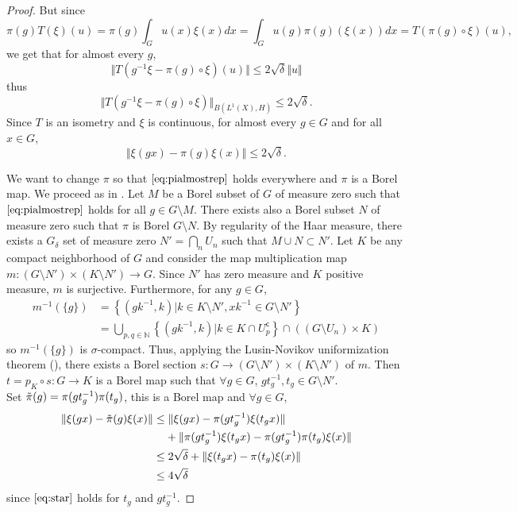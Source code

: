 \documentclass{article}
\theoremstyle{definition}
\theoremstyle{remark}
\numberwithin{equation}{section}
\newcommand{\N}{\mathbb{N}}
\begin{document}
\begin{proof}
But since $$\pi(g)T(\xi)(u)=\pi(g)\int_G u(x)\xi(x)dx=\int_G u(g)\pi(g)(\xi(x))dx=T(\pi(g)\circ \xi)(u),$$we get that for almost every $g$, $$\Vert T(g^{-1}\xi-\pi(g)\circ \xi)(u)\Vert \leq 2\sqrt{\delta}\Vert u\Vert$$
thus $$\Vert T(g^{-1}\xi-\pi(g)\circ \xi)\Vert_{B(L^1(X),H)} \leq 2\sqrt{\delta}.$$Since $T$ is an isometry and $\xi$ is continuous, for almost every $g\in G$ and for all $x\in G$, \begin{equation}
    \label{eq:star} \Vert \xi(gx)-\pi(g)\xi(x)\Vert \leq 2\sqrt{\delta}. 
\end{equation}

We want to change $\pi$ so that $\eqref{eq:pialmostrep}$ holds everywhere and $\pi$ is a Borel map. We proceed as in \cite{Ozawa+2011+89+104}. Let $M$ be a Borel subset of $G$ of measure zero such that $\eqref{eq:pialmostrep}$ holds for all $g\in G\setminus M$. There exists also a Borel subset $N$ of measure zero such that $\pi$ is Borel $G\setminus N$. By regularity of the Haar measure, there exists a $G_\delta$ set of measure zero $N'=\bigcap_n U_n$ such that $M\cup N\subset N'$. Let $K$ be any compact neighborhood of $G$ and consider the map multiplication map $m:(G\setminus N')\times (K\setminus N')\to G$. Since $N'$ has zero measure and $K$ positive measure, $m$ is surjective. Furthermore, for any $g\in G$, \begin{align*}
   m^{-1}(\{g\})  & = \left\lbrace (gk^{-1},k) \vert k\in K\setminus N', xk^{-1}\in G\setminus N'\right\rbrace \\
     & =  \bigcup_{p,q\in \N} \left\lbrace(gk^{-1},k) \vert k\in K\cap U_p^\mathsf{c}\right\rbrace \cap \left((G\setminus U_n)\times K\right)
\end{align*}so $m^{-1}(\{g\})$ is $\sigma$-compact. Thus, applying the Lusin-Novikov uniformization theorem (\cite[Thm.35.46]{kechris2012classical}), there exists a Borel section $s:G\to (G\setminus N')\times (K\setminus N')$ of $m$. Then $t=p_K\circ s:G\to K$ is a Borel map  such that $\forall g\in G$, $gt_g^{-1},t_g\in G\setminus N'$.\\
Set $\Tilde{\pi}(g)=\pi(gt_g^{-1})\pi(t_g)$, this is a Borel map and $\forall g\in G$, \begin{align*}
   \Vert \xi(gx)-\Tilde{\pi}(g)\xi(x)\Vert  & \leq  \Vert \xi(gx)-\pi(gt_g^{-1})\xi(t_gx)\Vert\\&\phantom{{}\leq}+\Vert \pi(gt_g^{-1})\xi(t_gx)- \pi(gt_g^{-1})\pi(t_g)\xi(x)\Vert \\
     & \leq  2\sqrt{\delta}+\Vert  \xi(t_gx)- \pi(t_g)\xi(x)\Vert \\
     & \leq  4\sqrt{\delta}
\end{align*}since $\eqref{eq:star}$ holds for $t_g$ and $gt_g^{-1}$.\medskip


\end{proof}
\end{document}
